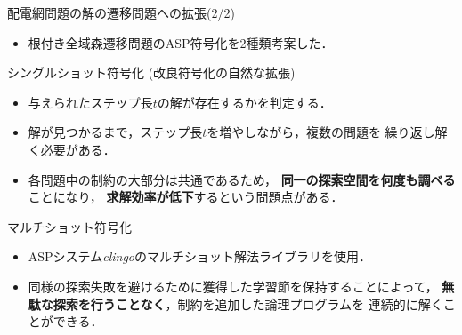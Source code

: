 \begin{frame}{配電網問題の解の遷移問題への拡張(2/2)}
 \begin{itemize}
  \item 根付き全域森遷移問題のASP符号化を2種類考案した．
 \end{itemize}
 \begin{block}{シングルショット符号化 (改良符号化の自然な拡張)}
    \begin{itemize}
    \item 与えられたステップ長$t$の解が存在するかを判定する．
    \item 解が見つかるまで，ステップ長$t$を増やしながら，複数の問題を
      繰り返し解く必要がある．
    \item 各問題中の制約の大部分は共通であるため，
      \textbf{同一の探索空間を何度も調べる}ことになり，
      \textbf{求解効率が低下}するという問題点がある．
  \end{itemize}
 \end{block}
 \vfill
 \begin{alertblock}{マルチショット符号化}
   \begin{itemize}
   \item ASPシステム\textit{clingo}のマルチショット解法ライブラリを使用．
   \item 同様の探索失敗を避けるために獲得した学習節を保持することによって，
		 \textbf{無駄な探索を行うことなく}，制約を追加した論理プログラムを
		 連続的に解くことができる．
  \end{itemize}
 \end{alertblock}
\end{frame}

